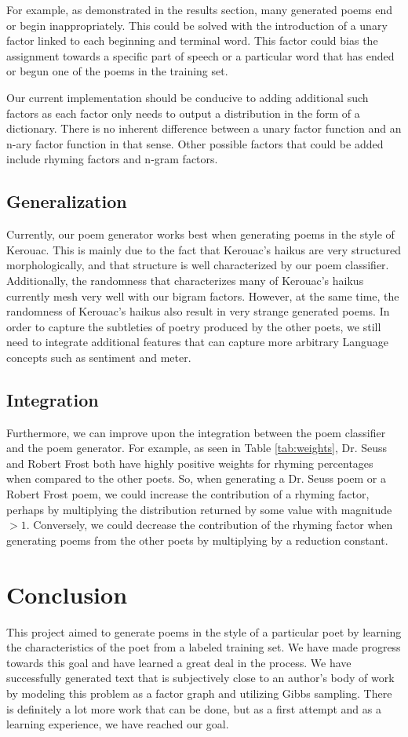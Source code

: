 \documentclass[journal]{IEEEtran}
\begin{document}
For example, as demonstrated in the results section, many generated poems end or begin inappropriately. This could be solved with the introduction of a unary factor linked to each beginning and terminal word. This factor could bias the assignment towards a specific part of speech or a particular word that has ended or begun one of the poems in the training set.

 Our current implementation should be conducive to adding additional such factors as each factor only needs to output a distribution in the form of a dictionary. There is no inherent difference between a unary factor function and an n-ary factor function in that sense. Other possible factors that could be added include rhyming factors and n-gram factors.
 
\subsection{Generalization}
Currently, our poem generator works best when generating poems in the style of Kerouac. This is mainly due to the fact that Kerouac's haikus are very structured morphologically, and that structure is well characterized by our poem classifier. Additionally, the randomness that characterizes many of Kerouac's haikus currently mesh very well with our bigram factors. However, at the same time, the randomness of Kerouac's haikus also result in very strange generated poems. In order to capture the subtleties of poetry produced by the other poets, we still need to integrate additional features that can capture more arbitrary Language concepts such as sentiment and meter.
\subsection{Integration}
Furthermore, we can improve upon the integration between the poem classifier and the poem generator. For example, as seen in Table \ref{tab:weights}, Dr. Seuss and Robert Frost both have highly positive weights for rhyming percentages when compared to the other poets. So, when generating a Dr. Seuss poem or a Robert Frost poem, we could increase the contribution of a rhyming factor, perhaps by multiplying the distribution returned by some value with magnitude $>1$. Conversely, we could decrease the contribution of the rhyming factor when generating poems from the other poets by multiplying by a reduction constant.

\section{Conclusion}
This project aimed to generate poems in the style of a particular poet by learning the characteristics of the poet from a labeled training set. We have made progress towards this goal and have learned a great deal in the process. We have successfully generated text that is subjectively close to an author's body of work by modeling this problem as a factor graph and utilizing Gibbs sampling. There is definitely a lot more work that can be done, but as a first attempt and as a learning experience, we have reached our goal. 
\end{document}
